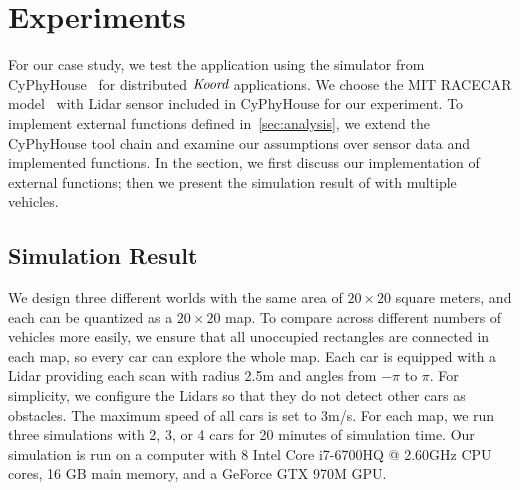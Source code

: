 \newcommand{\Koord}{\ensuremath{\lgname}\xspace}
\newcommand{\CyPhyHouse}{CyPhyHouse\xspace}
\newcommand{\Gazebo}{Gazebo\xspace}

\newcommand{\ScanToMap}{\ensuremath{\mathit{scanToMap}}\xspace}
\newcommand{\TSync}{\ensuremath{\mathit{tSync}}\xspace}
\newcommand{\PathToFrontier}{\ensuremath{\mathit{pickPathToFrontier}}\xspace}

\section{Experiments}
\label{sec:experiments}


For our case study, we test the \dmap application using the simulator from \CyPhyHouse~\cite{ghosh2019cyphyhouse} for distributed \Koord applications.
We choose the MIT RACECAR model~\cite{MIT_RACECAR} with Lidar sensor included in \CyPhyHouse for our experiment.
To implement external functions defined in~\ref{sec:analysis},
we extend the \CyPhyHouse tool chain and examine our assumptions over sensor data and implemented functions.
In the section, we first discuss our implementation of external functions;
then we present the simulation result of \dmap with multiple vehicles.

\subsection{Simulation Result}

We design three different worlds with the same area of $20\times20$ square meters,
and each can be quantized as a $20 \times 20$ map.
To compare across different numbers of vehicles more easily,
we ensure that all unoccupied rectangles are connected in each map,
so every car can explore the whole map.
Each car is equipped with a Lidar providing each scan with radius 2.5m and angles from $-\pi$ to $\pi$.
For simplicity, we configure the Lidars so that they do not detect other cars as obstacles.
The maximum speed of all cars is set to 3m/s.
For each map, we run three simulations with 2, 3, or 4 cars for 20 minutes of simulation time.
Our simulation is run on a computer with 8 Intel Core i7-6700HQ @ 2.60GHz CPU cores, 16 GB main memory, and a GeForce GTX 970M GPU.


